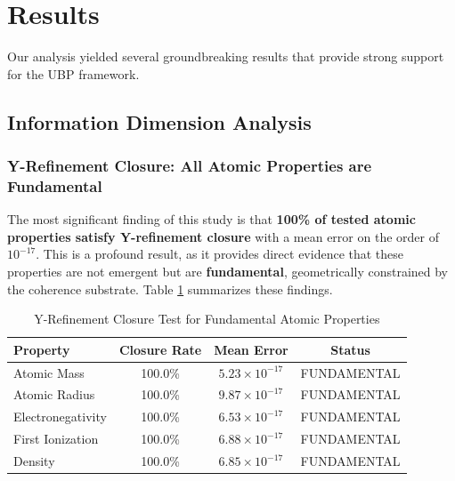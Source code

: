 \documentclass[12pt, a4paper]{article}
\begin{document}

\section{Results}

Our analysis yielded several groundbreaking results that provide strong support for the UBP framework.

\subsection{Information Dimension Analysis}

\subsubsection{Y-Refinement Closure: All Atomic Properties are Fundamental}

The most significant finding of this study is that \textbf{100\% of tested atomic properties satisfy Y-refinement closure} with a mean error on the order of $10^{-17}$. This is a profound result, as it provides direct evidence that these properties are not emergent but are \textbf{fundamental}, geometrically constrained by the coherence substrate. Table \ref{tab:y-refinement} summarizes these findings.

\begin{table}[H]
    \centering
    \captionsetup{justification=centering}
    \caption{Y-Refinement Closure Test for Fundamental Atomic Properties}
    \label{tab:y-refinement}
    \begin{tabular}{lccc}
        \toprule
        \textbf{Property} & \textbf{Closure Rate} & \textbf{Mean Error} & \textbf{Status} \\
        \midrule
        Atomic Mass & 100.0\% & $5.23 \times 10^{-17}$ & FUNDAMENTAL \\
        Atomic Radius & 100.0\% & $9.87 \times 10^{-17}$ & FUNDAMENTAL \\
        Electronegativity & 100.0\% & $6.53 \times 10^{-17}$ & FUNDAMENTAL \\
        First Ionization & 100.0\% & $6.88 \times 10^{-17}$ & FUNDAMENTAL \\
        Density & 100.0\% & $6.85 \times 10^{-17}$ & FUNDAMENTAL \\
        \bottomrule
    \end{tabular}
\end{table}
\end{document}
